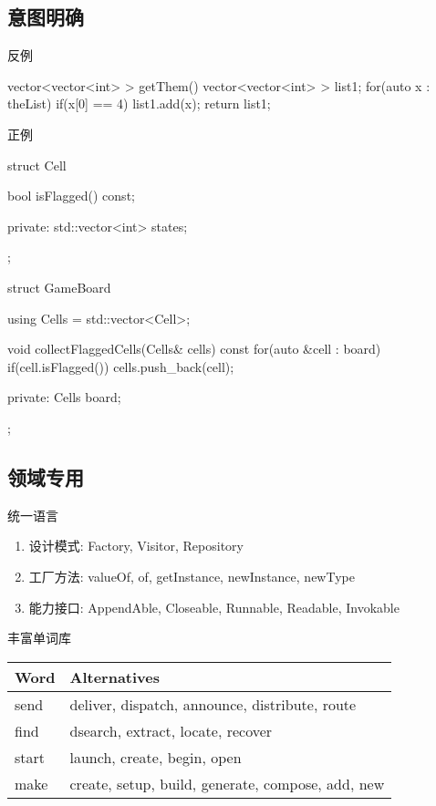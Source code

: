 \subsection{意图明确}

\begin{frame}[fragile]{反例}
  \begin{c++}
vector<vector<int> > getThem() {
  vector<vector<int> > list1;    
  for(auto x : theList) {
    if(x[0] == 4) {
      list1.add(x);
    }
  }  
  return list1;
}
  \end{c++}
\end{frame}

\begin{frame}[fragile]{正例}
  \begin{c++}
struct Cell {
  bool isFlagged() const;

private:
  std::vector<int> states;
};

struct GameBoard {
  using Cells = std::vector<Cell>;

  void collectFlaggedCells(Cells& cells) const {
    for(auto &cell : board) {
      if(cell.isFlagged()) {
        cells.push_back(cell);
      }
    }
  }

private:
  Cells board;
};
  \end{c++}
\end{frame}

\subsection{领域专用}

\begin{frame}[fragile]{统一语言}
\begin{enumerate}
  \item \alert{设计模式:} Factory, Visitor, Repository
  \item \alert{工厂方法:} valueOf, of, getInstance, newInstance, newType
  \item \alert{能力接口:} AppendAble, Closeable, Runnable, Readable, Invokable
\end{enumerate}
\end{frame}

\begin{frame}[fragile]{丰富单词库}
\begin{table}[!htb]
\begin{tabular*}{1.0\textwidth}{@{}ll@{}}
\hline
Word & Alternatives \\
\hline
send  & deliver, dispatch, announce, distribute, route \\
find & dsearch, extract, locate, recover \\ 
start & launch, create, begin, open \\
make & create, setup, build, generate, compose, add, new \\
\hline
\end{tabular*}
\end{table}
\end{frame}
